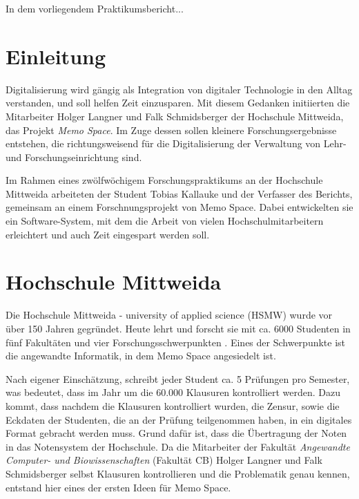 \documentclass[nomenclature, oneside, 150]{HSMW-Thesis}
\begin{document}
\begin{Referat}
In dem vorliegendem Praktikumsbericht...

\end{Referat}


\Hauptteil


\chapter{Einleitung}
	Digitalisierung wird gängig als Integration von digitaler Technologie in den Alltag verstanden, und soll helfen Zeit einzusparen. Mit diesem Gedanken initiierten die Mitarbeiter Holger Langner und Falk Schmidsberger der Hochschule Mittweida, das Projekt \textit{Memo Space}. Im Zuge dessen sollen kleinere Forschungsergebnisse entstehen, die richtungsweisend für die Digitalisierung der Verwaltung von Lehr- und Forschungseinrichtung sind.

	Im Rahmen eines zwölfwöchigem Forschungspraktikums an der Hochschule Mittweida arbeiteten der Student Tobias Kallauke und der Verfasser des Berichts, gemeinsam an einem Forschnungsprojekt von Memo Space. Dabei entwickelten sie ein Software-System, mit dem die Arbeit von vielen Hochschulmitarbeitern erleichtert und auch Zeit eingespart werden soll.


\chapter{Hochschule Mittweida}
	Die Hochschule Mittweida - university of applied science (HSMW)  wurde vor über 150 Jahren gegründet. Heute lehrt und forscht sie mit ca. 6000 Studenten in fünf Fakultäten und vier Forschungsschwerpunkten\cite{noauthor_hochschule_nodate} . Eines der Schwerpunkte ist die angewandte Informatik, in dem Memo Space angesiedelt ist.
	
	Nach eigener Einschätzung, schreibt jeder Student ca. 5 Prüfungen pro Semester, was bedeutet, dass im Jahr um die 60.000 Klausuren kontrolliert werden. Dazu kommt, dass nachdem die Klausuren kontrolliert wurden, die Zensur, sowie die Eckdaten der Studenten, die an der Prüfung teilgenommen haben, in ein digitales Format gebracht werden muss. Grund dafür ist, dass die Übertragung der Noten in das Notensystem der Hochschule. Da die Mitarbeiter der Fakultät \textit{Angewandte Computer- und Biowissenschaften} (Fakultät CB) Holger Langner und Falk Schmidsberger selbst Klausuren kontrollieren und die Problematik genau kennen, entstand hier eines der ersten Ideen für Memo Space.
\end{document}
